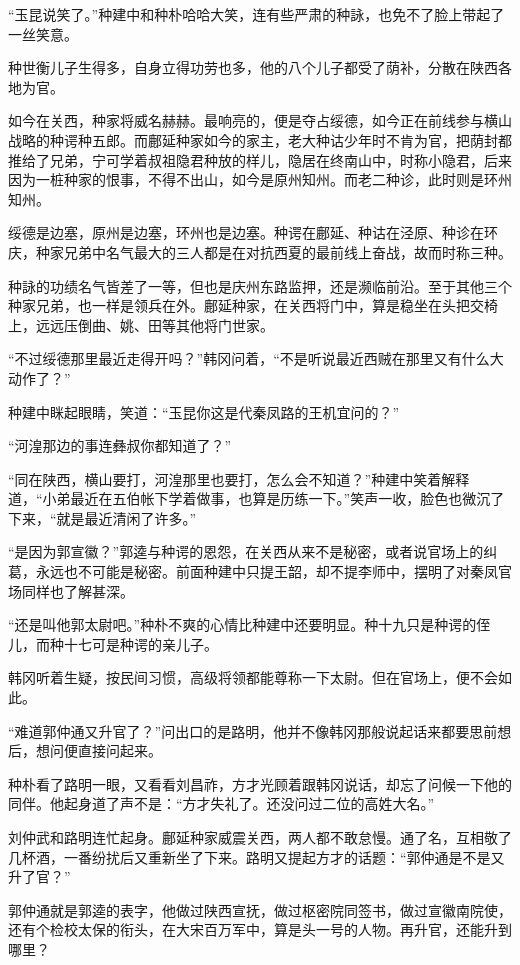 “玉昆说笑了。”种建中和种朴哈哈大笑，连有些严肃的种詠，也免不了脸上带起了一丝笑意。

种世衡儿子生得多，自身立得功劳也多，他的八个儿子都受了荫补，分散在陕西各地为官。

如今在关西，种家将威名赫赫。最响亮的，便是夺占绥德，如今正在前线参与横山战略的种谔种五郎。而鄜延种家如今的家主，老大种诂少年时不肯为官，把荫封都推给了兄弟，宁可学着叔祖隐君种放的样儿，隐居在终南山中，时称小隐君，后来因为一桩种家的恨事，不得不出山，如今是原州知州。而老二种诊，此时则是环州知州。

绥德是边塞，原州是边塞，环州也是边塞。种谔在鄜延、种诂在泾原、种诊在环庆，种家兄弟中名气最大的三人都是在对抗西夏的最前线上奋战，故而时称三种。

种詠的功绩名气皆差了一等，但也是庆州东路监押，还是濒临前沿。至于其他三个种家兄弟，也一样是领兵在外。鄜延种家，在关西将门中，算是稳坐在头把交椅上，远远压倒曲、姚、田等其他将门世家。

“不过绥德那里最近走得开吗？”韩冈问着，“不是听说最近西贼在那里又有什么大动作了？”

种建中眯起眼睛，笑道：“玉昆你这是代秦凤路的王机宜问的？”

“河湟那边的事连彝叔你都知道了？”

“同在陕西，横山要打，河湟那里也要打，怎么会不知道？”种建中笑着解释道，“小弟最近在五伯帐下学着做事，也算是历练一下。”笑声一收，脸色也微沉了下来，“就是最近清闲了许多。”

“是因为郭宣徽？”郭逵与种谔的恩怨，在关西从来不是秘密，或者说官场上的纠葛，永远也不可能是秘密。前面种建中只提王韶，却不提李师中，摆明了对秦凤官场同样也了解甚深。

“还是叫他郭太尉吧。”种朴不爽的心情比种建中还要明显。种十九只是种谔的侄儿，而种十七可是种谔的亲儿子。

韩冈听着生疑，按民间习惯，高级将领都能尊称一下太尉。但在官场上，便不会如此。

“难道郭仲通又升官了？”问出口的是路明，他并不像韩冈那般说起话来都要思前想后，想问便直接问起来。

种朴看了路明一眼，又看看刘昌祚，方才光顾着跟韩冈说话，却忘了问候一下他的同伴。他起身道了声不是：“方才失礼了。还没问过二位的高姓大名。”

刘仲武和路明连忙起身。鄜延种家威震关西，两人都不敢怠慢。通了名，互相敬了几杯酒，一番纷扰后又重新坐了下来。路明又提起方才的话题：“郭仲通是不是又升了官？”

郭仲通就是郭逵的表字，他做过陕西宣抚，做过枢密院同签书，做过宣徽南院使，还有个检校太保的衔头，在大宋百万军中，算是头一号的人物。再升官，还能升到哪里？

